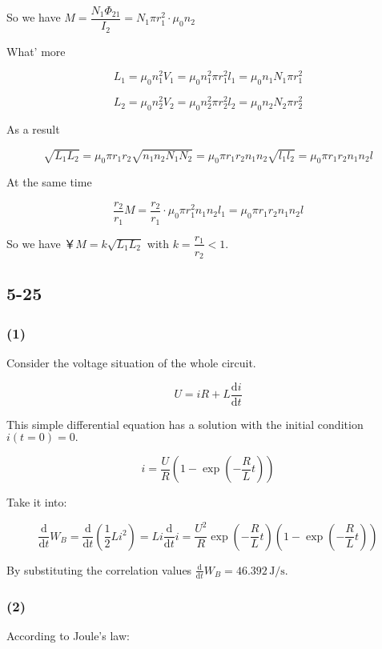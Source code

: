 \documentclass[a4paper,11pt]{amsart}
\theoremstyle{definition}
\begin{document}
	So we have $\displaystyle M=\dfrac{N_1\varPhi_{21}}{I_2}=N_1\pi r_{1}^{2}\cdot\mu_0n_2$
	
	What' more 
	
	$$
	L_1=\mu _0n_{1}^{2}V_1=\mu _0n_{1}^{2}\pi r_{1}^{2}l_1=\mu _0n_1N_1\pi r_{1}^{2}
	$$
	
	$$
	L_2=\mu _0n_{2}^{2}V_2=\mu _0n_{2}^{2}\pi r_{2}^{2}l_2=\mu _0n_2N_2\pi r_{2}^{2}
	$$
	
	As a result
	
	$$
	\sqrt{L_1L_2}=\mu_0\pi r_1r_2\sqrt{n_1n_2N_1N_2}=\mu_0\pi r_1r_2n_1n_2\sqrt{l_1l_2}=\mu_0\pi r_1r_2n_1n_2l
	$$
	
	At the same time
	
	$$
	\dfrac{r_2}{r_1}M=\dfrac{r_2}{r_1}\cdot \mu _0\pi r_1^2n_1n_2l_1=\mu_0\pi r_1r_2n_1n_2l
	$$
	
	So we have ￥$\displaystyle M=k\sqrt{L_1L_2}$ with $k=\dfrac{r_1}{r_2}<1$.
	
	\subsection*{5-25}
	
	\subsubsection*{(1)}
	
	Consider the voltage situation of the whole circuit.
	
	$$
	U=iR+L\frac{\mathrm{d}i}{\mathrm{d}t}
	$$
	
	This simple differential equation has a solution with the initial condition $\displaystyle i(t=0)=0.$
	
	$$
	i=\frac{U}{R}\left( 1-\exp \left( -\frac{R}{L}t \right) \right) 
	$$
	
	Take it into:
	
	$$
	\frac{\mathrm{d}}{\mathrm{d}t}W_B=\frac{\mathrm{d}}{\mathrm{d}t}\left( \frac{1}{2}Li^2 \right) =Li\frac{\mathrm{d}}{\mathrm{d}t}i=\frac{U^2}{R}\exp \left( -\frac{R}{L}t \right) \left( 1-\exp \left( -\frac{R}{L}t \right) \right) 
	$$
	
	By substituting the correlation values $\displaystyle \frac{\mathrm{d}}{\mathrm{d}t}W_B=46.392\,\mathrm{J}/\mathrm{s}.$
	
	\subsubsection*{(2)}
	
	According to Joule's law:
	
\end{document}
